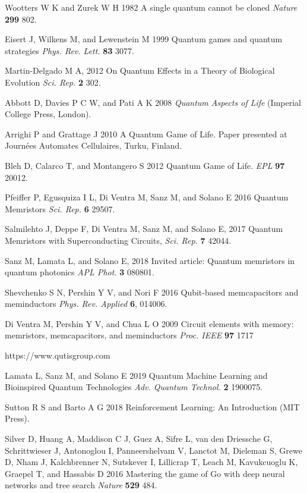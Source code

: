 \documentclass[12pt]{iopart}
\begin{document}
\begin{thebibliography}{999}
 Wootters W K and Zurek W H 1982 A single quantum cannot be cloned {\it Nature} {\bf 299} 802.

 Eisert J, Wilkens M, and Lewenstein M 1999 Quantum games and quantum strategies
{\it Phys. Rev. Lett.} {\bf 83} 3077.

 Martin-Delgado M A, 2012 On Quantum Effects in a Theory of Biological Evolution {\it Sci. Rep.} {\bf 2} 302. 

 Abbott D, Davies P C W, and Pati A K 2008 {\it  Quantum Aspects of Life} (Imperial College Press, London).

 Arrighi P and Grattage J 2010 A Quantum Game of Life. Paper presented at Journ\'{e}es Automates Cellulaires, Turku, Finland.

Bleh D, Calarco T, and Montangero S 2012 Quantum Game of Life. {\it EPL} {\bf 97} 20012.

 Pfeiffer P, Egusquiza I L, Di Ventra M, Sanz M, and Solano E 2016 Quantum Memristors {\it Sci. Rep.} {\bf 6} 29507.

 Salmilehto J, Deppe F, Di Ventra M, Sanz M, and Solano E, 2017 Quantum Memristors with Superconducting Circuits, {\it Sci. Rep.} {\bf 7} 42044.

 Sanz M, Lamata L, and Solano E, 2018 Invited article: Quantum memristors in quantum photonics {\it APL Phot.} {\bf 3} 080801.

 Shevchenko S N, Pershin Y V, and Nori F 2016 Qubit-based memcapacitors and meminductors {\it Phys. Rev. Applied} {\bf 6}, 014006.

 Di Ventra M, Pershin Y V, and Chua L O 2009 Circuit elements with memory: memristors, memcapacitors, and meminductors {\it Proc. IEEE} {\bf 97} 1717

 https://www.qutisgroup.com

  Lamata L, Sanz M, and Solano E 2019 Quantum Machine Learning and Bioinspired Quantum Technologies {\it Adv. Quantum Technol.} {\bf 2} 1900075. 

 Sutton R S and Barto A G 2018 Reinforcement Learning: An Introduction (MIT Press).

 Silver D, Huang A, Maddison C J, Guez A, Sifre L, van den Driessche G, Schrittwieser J, Antonoglou I, Panneershelvam V, Lanctot M, Dieleman S, Grewe D, Nham J, Kalchbrenner N, Sutskever I, Lillicrap T, Leach M, Kavukcuoglu K, Graepel T, and Hassabis D 2016 Mastering the game of Go with deep neural networks and tree search {\it Nature} {\bf 529} 484.


\end{thebibliography}
\end{document}
